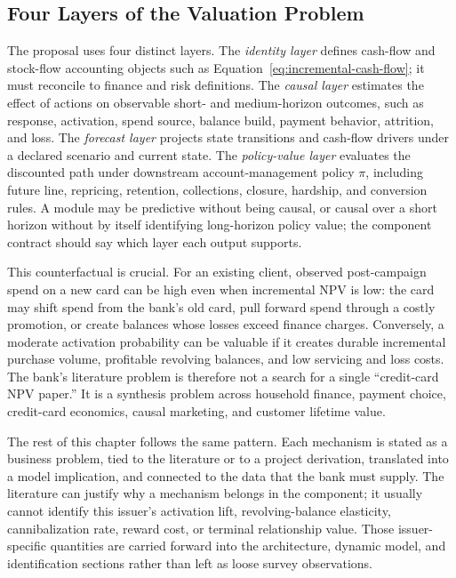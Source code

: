 \documentclass[11pt]{article}
\newcommand{\1}{\mathbf{1}}
\begin{document}
\subsection*{Four Layers of the Valuation Problem}

The proposal uses four distinct layers. The \emph{identity layer} defines
cash-flow and stock-flow accounting objects such as
Equation~\eqref{eq:incremental-cash-flow}; it must reconcile to finance and
risk definitions. The \emph{causal layer} estimates the effect of actions on
observable short- and medium-horizon outcomes, such as response, activation,
spend source, balance build, payment behavior, attrition, and loss. The
\emph{forecast layer} projects state transitions and cash-flow drivers under a
declared scenario and current state. The \emph{policy-value layer} evaluates
the discounted path under downstream account-management policy $\pi$, including
future line, repricing, retention, collections, closure, hardship, and
conversion rules. A module may be predictive without being causal, or causal
over a short horizon without by itself identifying long-horizon policy value;
the component contract should say which layer each output supports.

This counterfactual is crucial. For an existing client, observed post-campaign
spend on a new card can be high even when incremental NPV is low: the card may
shift spend from the bank's old card, pull forward spend through a costly
promotion, or create balances whose losses exceed finance charges. Conversely, a
moderate activation probability can be valuable if it creates durable
incremental purchase volume, profitable revolving balances, and low servicing
and loss costs. The bank's literature problem is therefore not a search for a
single ``credit-card NPV paper.'' It is a synthesis problem across household
finance, payment choice, credit-card economics, causal marketing, and customer
lifetime value.

The rest of this chapter follows the same pattern. Each mechanism is stated
as a business problem, tied to the literature or to a project derivation,
translated into a model implication, and connected to the data that the bank
must supply. The literature can justify why a mechanism belongs in the
component; it usually cannot identify this issuer's activation lift,
revolving-balance elasticity, cannibalization rate, reward cost, or terminal
relationship value. Those issuer-specific quantities are carried forward into
the architecture, dynamic model, and identification sections rather than left
as loose survey observations.
\end{document}
